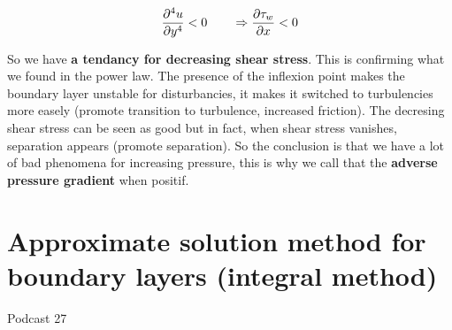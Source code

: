 	\begin{equation}
		\frac{\partial ^4 u}{\partial y^4} <0 \qquad \Rightarrow \frac{\partial \tau _w}{\partial x} < 0
	\end{equation}
			
	So we have \textbf{a tendancy for decreasing shear stress}. This is confirming what we found in the power law. The presence of the inflexion point makes the boundary layer unstable for disturbancies, it makes it switched to turbulencies more easely (promote transition to turbulence, increased friction). The decresing shear stress can be seen as good but in fact, when shear stress vanishes, separation appears (promote separation). So the conclusion is that we have a lot of bad phenomena for increasing pressure, this is why we call that the \textbf{adverse pressure gradient} when positif. 
	

\section{Approximate solution method for boundary layers (integral method)}
	Podcast 27
			